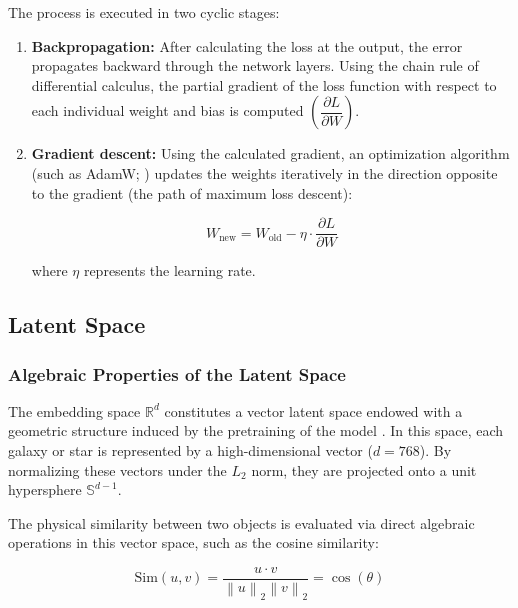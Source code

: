 The process is executed in two cyclic stages:
\begin{enumerate}
\item \textbf{Backpropagation:} After calculating the loss at the output, the error propagates backward through the network layers. Using the chain rule of differential calculus, the partial gradient of the loss function with respect to each individual weight and bias is computed $\left(\dfrac{\partial L}{\partial W}\right)$.
\item \textbf{Gradient descent:} Using the calculated gradient, an optimization algorithm (such as AdamW; \textcite{ar:loshchilov-2019}) updates the weights iteratively in the direction opposite to the gradient (the path of maximum loss descent):

\begin{equation}
W_{\text{new}} = W_{\text{old}} - \eta \cdot \dfrac{\partial L}{\partial W}
\label{eq:gradient_descent}
\end{equation}

   where $\eta$ represents the learning rate.
\end{enumerate}

\subsection{Latent Space} \label{sec:tb:emb}

\subsubsection{Algebraic Properties of the Latent Space}

The embedding space $\mathbb{R}^d$ constitutes a vector latent space endowed with a geometric structure induced by the pretraining of the model \autocites{ar:astropt}{ar:astroclip}. In this space, each galaxy or star is represented by a high-dimensional vector ($d = 768$). By normalizing these vectors under the $L_2$ norm, they are projected onto a unit hypersphere $\mathbb{S}^{d-1}$.

The physical similarity between two objects is evaluated via direct algebraic operations in this vector space, such as the cosine similarity:

\begin{equation}
\text{Sim}\left(u, v\right) = \dfrac{u \cdot v}{\left\|u\right\|_2 \left\|v\right\|_2} = \cos\left(\theta\right)
\label{eq:cosine_similarity}
\end{equation}


